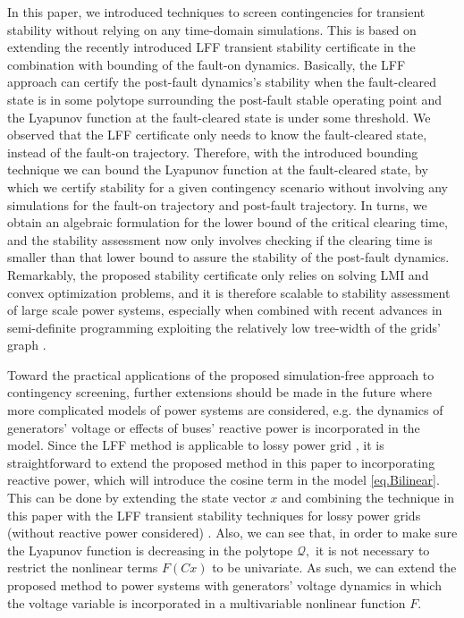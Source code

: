 \documentclass[final]{IEEEtran}
\begin{document}
In this paper, we introduced techniques to screen contingencies
for transient stability without relying on any time-domain simulations. This is based on extending the recently introduced LFF transient
stability certificate in the combination with bounding of the fault-on dynamics.
Basically, the LFF approach can certify the post-fault dynamics's
stability when the fault-cleared state is in some polytope
surrounding the post-fault stable operating point and the Lyapunov
function at the fault-cleared state is under some threshold. We
observed that the LFF certificate only needs to know the
fault-cleared state, instead of the fault-on trajectory.
Therefore, with the introduced bounding technique we can bound the
Lyapunov function at the fault-cleared state, by which we certify
stability for a given contingency scenario without involving any
simulations for the fault-on trajectory and post-fault trajectory.
In turns, we obtain an algebraic formulation for the lower bound of the critical
clearing time, and the stability assessment now only involves checking
if the clearing time is smaller than that lower bound to assure
the stability of the post-fault dynamics.  Remarkably, the proposed stability certificate only
relies on solving LMI and convex optimization problems, and it is therefore
scalable to stability assessment of large scale power systems, especially when combined with recent advances in semi-definite programming exploiting
the relatively low tree-width of the grids' graph \cite{Javadmadani2014sdp}.



Toward the practical applications of the proposed simulation-free
approach to contingency screening, further extensions should be
made in the future where more complicated models of power systems
are considered,
  e.g. the dynamics of generators' voltage or effects of buses' reactive power is incorporated in the model.
Since the LFF method is applicable to lossy power grid
\cite{Vu:2014acc}, it is straightforward to extend the proposed method in this paper to
incorporating reactive power, which will introduce the cosine term
in the model \eqref{eq.Bilinear}. This can be done by extending
the state vector $x$ and combining the technique in this paper
with the LFF transient stability techniques 
for lossy power grids (without reactive power considered) \cite{Vu:2014acc}. Also,
we can see that, in order to make sure the Lyapunov function is
decreasing in the polytope $\mathcal{Q},$ it is not necessary to
restrict the nonlinear terms $F(Cx)$ to be univariate. As such, we
can extend the proposed method to power systems with generators'
voltage dynamics in which the voltage variable is incorporated in
a multivariable nonlinear function $F.$
\end{document}
